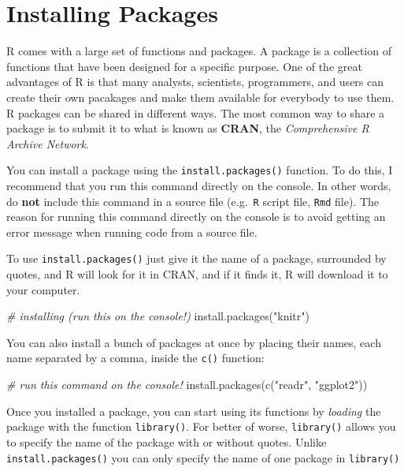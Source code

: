 \documentclass[
]{book}
\newenvironment{Shaded}{\begin{snugshade}}{\end{snugshade}}
\newcommand{\CommentTok}[1]{\textcolor[rgb]{0.56,0.35,0.01}{\textit{#1}}}
\newcommand{\FunctionTok}[1]{\textcolor[rgb]{0.00,0.00,0.00}{#1}}
\newcommand{\NormalTok}[1]{#1}
\newcommand{\StringTok}[1]{\textcolor[rgb]{0.31,0.60,0.02}{#1}}
\begin{document}
\hypertarget{installing-packages}{%
\section{Installing Packages}\label{installing-packages}}

R comes with a large set of functions and packages. A package is a collection
of functions that have been designed for a specific purpose. One of the great
advantages of R is that many analysts, scientists, programmers, and users
can create their own pacakages and make them available for everybody to use them.
R packages can be shared in different ways. The most common way to share a
package is to submit it to what is known as \textbf{CRAN}, the
\emph{Comprehensive R Archive Network}.

You can install a package using the \texttt{install.packages()} function. To do this,
I recommend that you run this command directly on the console. In other words,
do \textbf{not} include this command in a source file (e.g.~\texttt{R} script file, \texttt{Rmd}
file). The reason for running this command directly on the console is to avoid
getting an error message when running code from a source file.

To use \texttt{install.packages()} just give it the name of a package, surrounded by
quotes, and R will look for it in CRAN, and if it finds it, R will download it
to your computer.

\begin{Shaded}
\begin{Highlighting}[]
\CommentTok{\# installing (run this on the console!)}
\FunctionTok{install.packages}\NormalTok{(}\StringTok{"knitr"}\NormalTok{)}
\end{Highlighting}
\end{Shaded}

You can also install a bunch of packages at once by placing their names,
each name separated by a comma, inside the \texttt{c()} function:

\begin{Shaded}
\begin{Highlighting}[]
\CommentTok{\# run this command on the console!}
\FunctionTok{install.packages}\NormalTok{(}\FunctionTok{c}\NormalTok{(}\StringTok{"readr"}\NormalTok{, }\StringTok{"ggplot2"}\NormalTok{))}
\end{Highlighting}
\end{Shaded}

Once you installed a package, you can start using its functions by \emph{loading}
the package with the function \texttt{library()}. For better of worse, \texttt{library()}
allows you to specify the name of the package with or without quotes. Unlike
\texttt{install.packages()} you can only specify the name of one package in \texttt{library()}
\end{document}
